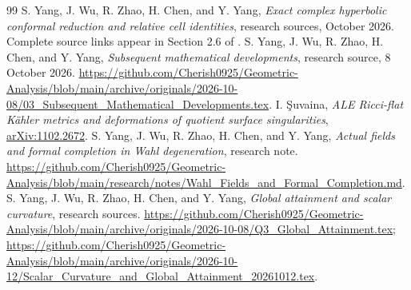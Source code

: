 \documentclass[11pt,a4paper]{article}
\theoremstyle{definition}\newtheorem{definition}[theorem]{Definition}
\theoremstyle{remark}\newtheorem{remark}[theorem]{Remark}
\begin{document}
\begin{thebibliography}{99}
S. Yang, J. Wu, R. Zhao, H. Chen, and Y. Yang, \emph{Exact complex hyperbolic conformal reduction and relative cell identities}, research sources, October 2026. Complete source links appear in Section 2.6 of \cite{RepoVariation}.
S. Yang, J. Wu, R. Zhao, H. Chen, and Y. Yang, \emph{Subsequent mathematical developments}, research source, 8 October 2026. \url{https://github.com/Cherish0925/Geometric-Analysis/blob/main/archive/originals/2026-10-08/03_Subsequent_Mathematical_Developments.tex}.
I. \c{S}uvaina, \emph{ALE Ricci-flat Kähler metrics and deformations of quotient surface singularities}, \href{https://arxiv.org/abs/1102.2672}{arXiv:1102.2672}.
S. Yang, J. Wu, R. Zhao, H. Chen, and Y. Yang, \emph{Actual fields and formal completion in Wahl degeneration}, research note. \url{https://github.com/Cherish0925/Geometric-Analysis/blob/main/research/notes/Wahl_Fields_and_Formal_Completion.md}.
S. Yang, J. Wu, R. Zhao, H. Chen, and Y. Yang, \emph{Global attainment and scalar curvature}, research sources. \url{https://github.com/Cherish0925/Geometric-Analysis/blob/main/archive/originals/2026-10-08/Q3_Global_Attainment.tex}; \url{https://github.com/Cherish0925/Geometric-Analysis/blob/main/archive/originals/2026-10-12/Scalar_Curvature_and_Global_Attainment_20261012.tex}.
\end{thebibliography}
\end{document}
